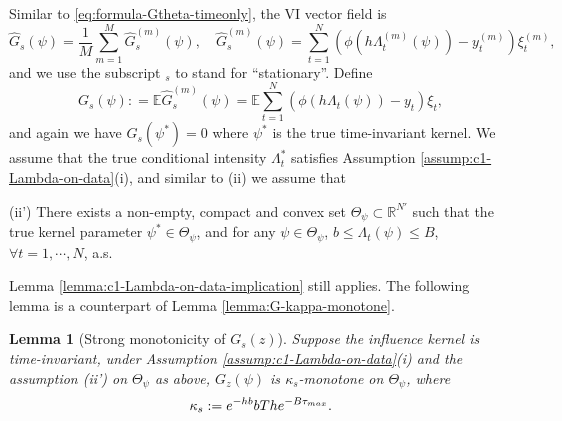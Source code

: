 \documentclass[11pt]{article}
\newtheorem{lemma}[theorem]{Lemma}
\theoremstyle{remark}
\theoremstyle{plain}
\newcommand{\E}{\mathbb{E}}
\newcommand{\R}{\mathbb{R}}
\begin{document}
Similar to \eqref{eq:formula-Gtheta-timeonly}, the VI vector field is 
\begin{equation}\label{eq:formula-Gtheta-timeonly-stationray}
\hat G_s( \psi ) =  
 \frac{1}{M} \sum_{m=1}^M 
 \hat G_s^{(m)}( \psi ),
 \quad 
 \hat G_s^{(m)}( \psi ) = 
\sum_{t=1}^N \left(\phi( h \Lambda_t^{(m)}( \psi )) - y_t^{(m)} \right) \xi_t^{(m)},
\end{equation}
and we use the subscript $_s$ to stand for ``stationary''. Define
\begin{equation}\label{eq:def-Gz-VI-stationary}
G_s( \psi )
: =  \E \hat G_s^{(m)}( \psi ) 
= \E \sum_{t=1}^N \left(\phi( h \Lambda_t (\psi)) - y_t \right) \xi_t,
\end{equation}
and again we have $G_s(\psi^*) = 0$ where $\psi^*$ is the true time-invariant kernel.
We assume that the true conditional intensity $\Lambda_t^*$ 
satisfies Assumption \ref{assump:c1-Lambda-on-data}(i), and similar to (ii) we assume that 

\vspace{5pt}
(ii')  There exists a non-empty, compact and convex set $\Theta_\psi \subset \R^{N'}$
such that the true kernel parameter  $\psi^* \in \Theta_\psi $, and for any $\psi \in \Theta_\psi$,
$b \le \Lambda_t( \psi )  \le B$, 
$\forall t= 1, \cdots, N$, a.s.
\vspace{5pt}

Lemma \ref{lemma:c1-Lambda-on-data-implication} still applies. The following lemma is a counterpart of Lemma \ref{lemma:G-kappa-monotone}.


\begin{lemma}[Strong monotonicity of $G_s(z)$]\label{lemma:G-kappa-monotone-stationary}
Suppose the influence kernel is time-invariant,
under Assumption \ref{assump:c1-Lambda-on-data}(i) and the assumption (ii') on $\Theta_\psi$  as above,
$G_z(\psi)$ is $\kappa_s$-monotone on $\Theta_\psi$, where
\begin{equation*}%
\kappa_s :=  e^{-hb} bT  h  e^{- B \tau_{\rm max}}.
\end{equation*}
\end{lemma}
\end{document}
